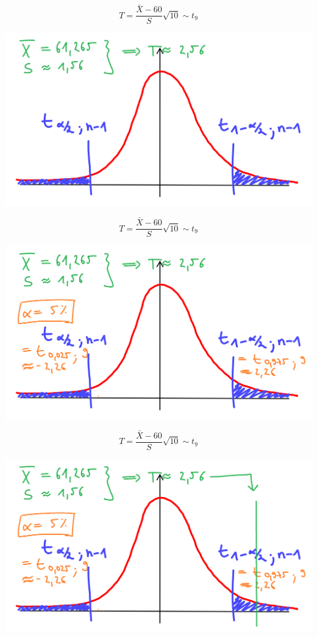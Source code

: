 \documentclass[t,11pt,aspectratio=169]{beamer}
\begin{document}
\begin{frame}
$$ T=\frac{\bar{X}-60}{S}\sqrt{10} \sim t_{9} $$
\begin{center}
\includegraphics[scale=0.4]{5b.png}
\end{center}
\end{frame}

\begin{frame}
$$ T=\frac{\bar{X}-60}{S}\sqrt{10} \sim t_{9} $$
\begin{center}
\includegraphics[scale=0.4]{5c.png}
\end{center}
\end{frame}

\begin{frame}
$$ T=\frac{\bar{X}-60}{S}\sqrt{10} \sim t_{9} $$
\begin{center}
\includegraphics[scale=0.4]{5d.png}
\end{center}
\end{frame}
\end{document}
